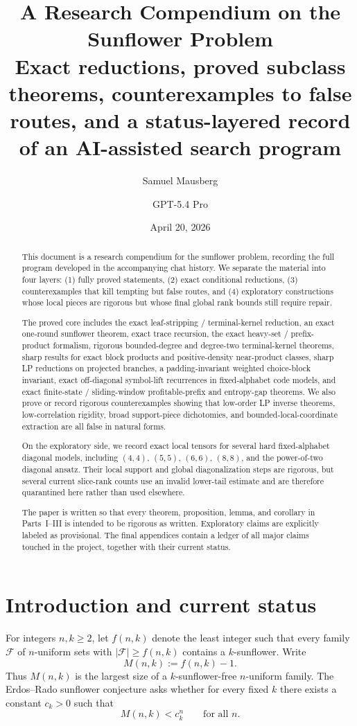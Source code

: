 \documentclass[11pt]{article}
\title{A Research Compendium on the Sunflower Problem\\[4pt]
\large Exact reductions, proved subclass theorems, counterexamples to false routes, and a status-layered record of an AI-assisted search program}
\author{Samuel Mausberg \and GPT-5.4 Pro}
\date{April 20, 2026}
\theoremstyle{definition}
\newcommand{\F}{\mathcal{F}}
\newcommand{\1}{\mathbf{1}}
\begin{document}
\maketitle

\begin{abstract}
This document is a research compendium for the sunflower problem,
recording the full program developed in the accompanying chat history.
We separate the material into four layers:
(1) fully proved statements,
(2) exact conditional reductions,
(3) counterexamples that kill tempting but false routes,
and (4) exploratory constructions whose local pieces are rigorous but whose final global rank bounds still require repair.

The proved core includes the exact leaf-stripping / terminal-kernel reduction,
an exact one-round sunflower theorem,
exact trace recursion,
the exact heavy-set / prefix-product formalism,
rigorous bounded-degree and degree-two terminal-kernel theorems,
sharp results for exact block products and positive-density near-product classes,
sharp LP reductions on projected branches,
a padding-invariant weighted choice-block invariant,
exact off-diagonal symbol-lift recurrences in fixed-alphabet code models,
and exact finite-state / sliding-window profitable-prefix and entropy-gap theorems.
We also prove or record rigorous counterexamples showing that low-order LP inverse theorems, low-correlation rigidity, broad support-piece dichotomies, and bounded-local-coordinate extraction are all false in natural forms.

On the exploratory side, we record exact local tensors for several hard fixed-alphabet diagonal models, including $(4,4)$, $(5,5)$, $(6,6)$, $(8,8)$, and the power-of-two diagonal ansatz. Their local support and global diagonalization steps are rigorous, but several current slice-rank counts use an invalid lower-tail estimate and are therefore quarantined here rather than used elsewhere.

The paper is written so that every theorem, proposition, lemma, and corollary in Parts~I--III is intended to be rigorous as written. Exploratory claims are explicitly labeled as provisional. The final appendices contain a ledger of all major claims touched in the project, together with their current status.
\end{abstract}

\tableofcontents

\section{Introduction and current status}
For integers $n,k\ge 2$, let $f(n,k)$ denote the least integer such that every family $\F$ of $n$-uniform sets with $|\F|\ge f(n,k)$ contains a $k$-sunflower.
Write
\[
M(n,k):=f(n,k)-1.
\]
Thus $M(n,k)$ is the largest size of a $k$-sunflower-free $n$-uniform family.
The Erdos--Rado sunflower conjecture asks whether for every fixed $k$ there exists a constant $c_k>0$ such that
\[
M(n,k)<c_k^n
\qquad\text{for all }n.
\]
\end{document}
